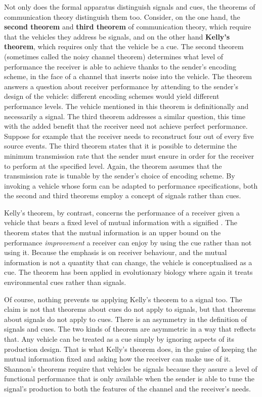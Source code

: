 Not only does the formal apparatus distinguish signals and cues, the theorems of communication theory distinguish them too.
Consider, on the one hand, the \textbf{second theorem} and \textbf{third theorem} of communication theory, which require that the vehicles they address be signals, and on the other hand \textbf{Kelly's theorem}, which requires only that the vehicle be a cue.
The second theorem (sometimes called the noisy channel theorem) determines what level of performance the receiver is able to achieve thanks to the sender's encoding scheme, in the face of a channel that inserts noise into the vehicle.
The theorem answers a question about receiver performance by attending to the sender's design of the vehicle: different encoding schemes would yield different performance levels.
The vehicle mentioned in this theorem is definitionally and necessarily a signal.
The third theorem addresses a similar question, this time with the added benefit that the receiver need not achieve perfect performance.
Suppose for example that the receiver needs to reconstruct four out of every five source events.
The third theorem states that it is possible to determine the minimum transmission rate that the sender must ensure in order for the receiver to perform at the specified level.
Again, the theorem assumes that the transmission rate is tunable by the sender's choice of encoding scheme.
By invoking a vehicle whose form can be adapted to performance specifications, both the second and third theorems employ a concept of signals rather than cues.

Kelly's theorem, by contrast, concerns the performance of a receiver given a vehicle that bears a fixed level of mutual information with a signified \citep{kelly1956new}.
The theorem states that the mutual information is an upper bound on the performance \textit{improvement} a receiver can enjoy by using the cue rather than not using it.
Because the emphasis is on receiver behaviour, and the mutual information is not a quantity that can change, the vehicle is conceptualised as a cue.
The theorem has been applied in evolutionary biology \citep{donaldson-matasci2010fitness} where again it treats environmental cues rather than signals.

Of course, nothing prevents us applying Kelly's theorem to a signal too.
The claim is not that theorems about cues do not apply to signals, but that theorems about signals do not apply to cues.
There is an asymmetry in the definition of signals and cues.
The two kinds of theorem are asymmetric in a way that reflects that.
Any vehicle can be treated as a cue simply by ignoring aspects of its production design.
That is what Kelly's theorem does, in the guise of keeping the mutual information fixed and asking how the receiver can make use of it.
Shannon's theorems require that vehicles be signals because they assure a level of functional performance that is only available when the sender is able to tune the signal's production to both the features of the channel and the receiver's needs.

